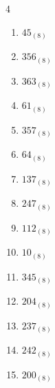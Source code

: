 \begin{multicols}{4}
\begin{enumerate}
        \phantom{$=208$}

  \item $45_{(8)}$

        \phantom{$=37$}

  \item $356_{(8)}$

        \phantom{$=238$}

  \item $363_{(8)}$

        \phantom{$=243$}

  \item $61_{(8)}$

        \phantom{$=49$}

  \item $357_{(8)}$

        \phantom{$=239$}

  \item $64_{(8)}$

        \phantom{$=52$}

  \item $137_{(8)}$

        \phantom{$=95$}

\columnbreak %

  \item $247_{(8)}$

        \phantom{$=167$}

  \item $112_{(8)}$

        \phantom{$=74$}

  \item $10_{(8)}$

        \phantom{$=8$}

  \item $345_{(8)}$

        \phantom{$=229$}

  \item $204_{(8)}$

        \phantom{$=132$}

  \item $237_{(8)}$

        \phantom{$=159$}

  \item $242_{(8)}$

        \phantom{$=162$}

  \item $200_{(8)}$

        \phantom{$=128$}


\end{enumerate}
\end{multicols}
